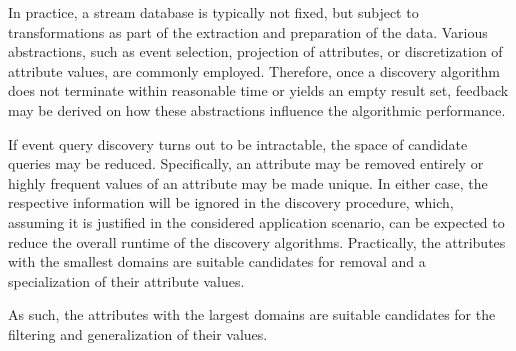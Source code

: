 In practice, a stream database is
typically not fixed, but subject to transformations as part of the extraction
and preparation of the data.
Various abstractions, such as
event selection, projection of attributes, or discretization
of attribute values, are commonly employed.
Therefore, once a discovery
algorithm does not terminate within
reasonable time or yields an empty result set, feedback may be derived on
how these abstractions influence the algorithmic performance.


If event query discovery turns out to be intractable, the space of
candidate queries may be reduced. Specifically, an
attribute may be removed entirely or highly frequent values of an attribute
may be made unique. In either case, the respective information will be
ignored in the discovery procedure, which, assuming it is justified in the
considered application scenario, can be expected to reduce the overall
runtime of the discovery algorithms. Practically, the attributes with the
smallest domains are suitable candidates for removal and a specialization of
their attribute values.


 
As such, the attributes with the largest domains are suitable candidates for
the filtering and generalization of their values.
